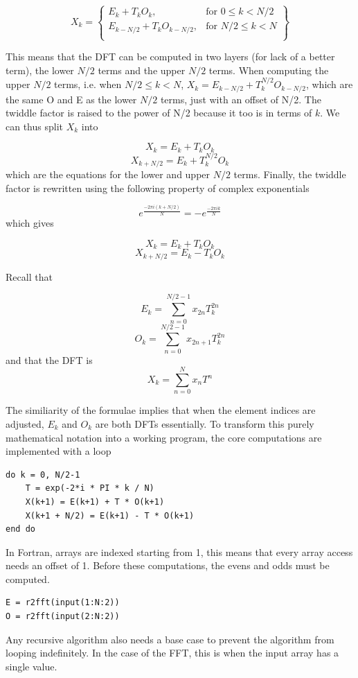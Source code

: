 \[
X_k = \left\{\begin{array}{lr}
    E_k + T_kO_k, & \text{for } 0 \leq k < N/2\\
    E_{k-N/2} + T_kO_{k-N/2}, & \text{for } N/2\leq k< N\\
    \end{array}\right\}
\]

This means that the DFT can be computed in two layers (for lack of a better term), the lower $N/2$ terms and the upper $N/2$ terms.
When computing the upper $N/2$ terms, i.e. when $N/2 \leq k < N$, $X_k = E_{k-N/2} + T_k^{N/2}O_{k-N/2}$, which are the same O and E as the lower $N/2$ terms, just with an offset of N/2. The twiddle factor is raised to the power of N/2 because it too is in terms of $k$. We can thus split $X_k$ into 

$$X_k = E_k + T_kO_k$$  
$$X_{k+N/2} = E_k + T_k^{N/2}O_k$$
which are the equations for the lower and upper $N/2$ terms. Finally, the twiddle factor is rewritten using the following property of complex exponentials

$$e^{\frac{-2\pi i(k+N/2)}{N}} = -e^{\frac{-2\pi ik}{N}}$$
which gives

$$X_k = E_k + T_kO_k$$  
$$X_{k+N/2} = E_k - T_kO_k$$

Recall that

$$E_k = \sum^{N/2-1}_{n=0} x_{2n}T_k^{2n}$$
$$O_k = \sum^{N/2-1}_{n=0} x_{2n+1}T_k^{2n}$$
and that the DFT is
$$X_k = \sum^{N}_{n=0} x_nT^{n}$$

The similiarity of the formulae implies that when the element indices are adjusted, $E_k$ and $O_k$ are both DFTs essentially. To transform this purely mathematical notation into a working program, the core computations are implemented with a loop

\begin{lstlisting}
do k = 0, N/2-1
    T = exp(-2*i * PI * k / N) 
    X(k+1) = E(k+1) + T * O(k+1)
    X(k+1 + N/2) = E(k+1) - T * O(k+1)
end do
\end{lstlisting}

In Fortran, arrays are indexed starting from 1, this means that every array access needs an offset of 1. Before these computations, the evens and odds must be computed.

\begin{lstlisting}
E = r2fft(input(1:N:2))
O = r2fft(input(2:N:2))
\end{lstlisting}

Any recursive algorithm also needs a base case to prevent the algorithm from looping indefinitely. In the case of the FFT, this is when the input array has a single value.

